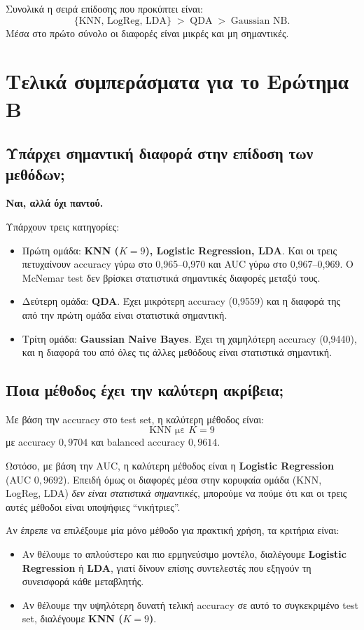 \documentclass[11pt,a4paper]{article}
\begin{document}
Συνολικά η σειρά επίδοσης που προκύπτει είναι:
\[
\{\text{KNN, LogReg, LDA}\}
\;>\;
\text{QDA}
\;>\;
\text{Gaussian NB}.
\]
Μέσα στο πρώτο σύνολο οι διαφορές είναι μικρές και μη σημαντικές.

\section{Τελικά συμπεράσματα για το Ερώτημα Β}

\subsection{Υπάρχει σημαντική διαφορά στην επίδοση των μεθόδων;}

\textbf{Ναι, αλλά όχι παντού.}

Υπάρχουν τρεις κατηγορίες:
\begin{itemize}
    \item Πρώτη ομάδα: \textbf{KNN (\(K=9\)), Logistic Regression, LDA}.
    Και οι τρεις πετυχαίνουν accuracy γύρω στο 0,965--0,970 και AUC
    γύρω στο 0,967--0,969. Ο McNemar test δεν βρίσκει στατιστικά
    σημαντικές διαφορές μεταξύ τους.

    \item Δεύτερη ομάδα: \textbf{QDA}. Έχει μικρότερη accuracy
    (0,9559) και η διαφορά της από την πρώτη ομάδα είναι στατιστικά
    σημαντική.

    \item Τρίτη ομάδα: \textbf{Gaussian Naive Bayes}. Έχει τη
    χαμηλότερη accuracy (0,9440), και η διαφορά του από όλες τις άλλες
    μεθόδους είναι στατιστικά σημαντική.
\end{itemize}

\subsection{Ποια μέθοδος έχει την καλύτερη ακρίβεια;}

Με βάση την accuracy στο test set, η καλύτερη μέθοδος είναι:
\[
\boxed{\text{KNN με } K = 9}
\]
με accuracy \(0{,}9704\) και balanced accuracy \(0{,}9614\).

Ωστόσο, με βάση την AUC, η καλύτερη μέθοδος είναι η
\textbf{Logistic Regression} (AUC \(0{,}9692\)). Επειδή όμως οι διαφορές
μέσα στην κορυφαία ομάδα (KNN, LogReg, LDA) \emph{δεν είναι στατιστικά
σημαντικές}, μπορούμε να πούμε ότι και οι τρεις αυτές μέθοδοι είναι
υποψήφιες ``νικήτριες''.

Αν έπρεπε να επιλέξουμε μία μόνο μέθοδο για πρακτική χρήση, τα
κριτήρια είναι:
\begin{itemize}
    \item Αν θέλουμε το απλούστερο και πιο ερμηνεύσιμο μοντέλο,
    διαλέγουμε \textbf{Logistic Regression} ή \textbf{LDA}, γιατί
    δίνουν επίσης συντελεστές που εξηγούν τη συνεισφορά κάθε μεταβλητής.
    \item Αν θέλουμε την υψηλότερη δυνατή τελική accuracy σε αυτό το
    συγκεκριμένο test set, διαλέγουμε \textbf{KNN (\(K=9\))}.
\end{itemize}
\end{document}
